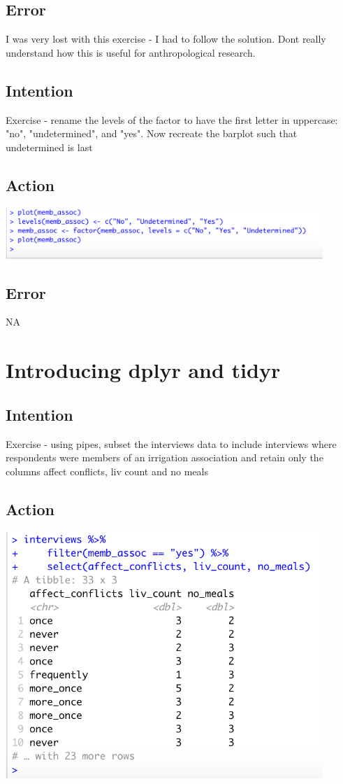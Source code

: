 \documentclass{article}
\begin{document}
\subsection{Error}
I was very lost with this exercise - I had to follow the solution. Dont really understand how this is useful for anthropological research.

\subsection{Intention}
Exercise - rename the levels of the factor to have the first letter in uppercase: "no", "undetermined", and "yes". Now recreate the barplot such that undetermined is last

\subsection{Action}
\includegraphics[width=12cm]{undetermined.png}

\subsection{Error}
NA

\section{Introducing dplyr and tidyr}

\subsection{Intention}
Exercise - using pipes, subset the interviews data to include interviews where respondents were members of an irrigation association and retain only the columns affect conflicts, liv count and no meals 

\subsection{Action}
\includegraphics[width=12cm]{pipes.png}
\end{document}
